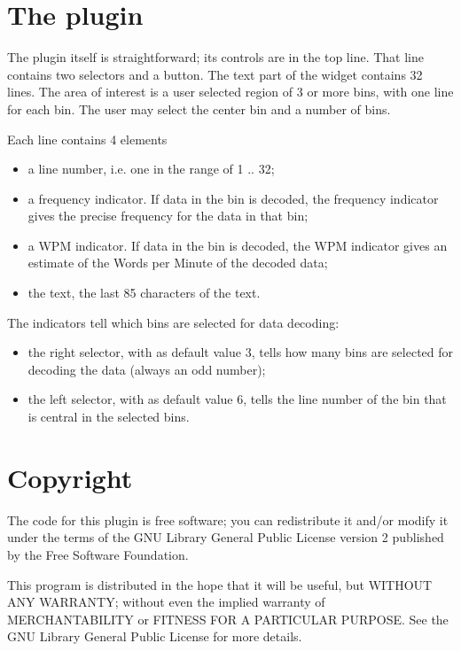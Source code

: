 \documentclass[10pt]{article}
\begin{document}
\section{The plugin}
The plugin itself is straightforward; its controls are in the
top line. That line contains two selectors and  a button.
The text part of the widget contains 32 lines.
The area of interest is a user selected region of 3 or more bins, with one line
for each bin. The user may select the center bin and a number of bins.
\par
Each line contains 4 elements
\begin{itemize}
\item a line number, i.e. one in the range of 1 .. 32;
\item a frequency indicator. If data in the bin is decoded, the
frequency indicator gives the precise frequency for the data in that bin;
\item a WPM indicator. If data in the bin is decoded, the
WPM indicator gives an estimate of the Words per Minute of the decoded data;
\item the text, the last 85 characters of the text.
\end{itemize}
The indicators tell which bins are selected for data decoding:
\begin{itemize}
\item the right selector, with as default value 3, tells how many bins
are selected for decoding the data (always an odd number);
\item the left selector, with as default value 6, tells the line number
of the bin that is central in the selected bins.
\end{itemize}
\section{Copyright}
The code for this plugin is free software; you can redistribute
it and/or modify it under the terms of the GNU Library General Public
License version 2 published by the Free Software Foundation.
\par
This program is distributed in the hope that it will be useful,
but WITHOUT ANY WARRANTY; without even the implied warranty of
MERCHANTABILITY or FITNESS FOR A PARTICULAR PURPOSE.  See the
GNU Library General Public License for more details.
\end{document}

